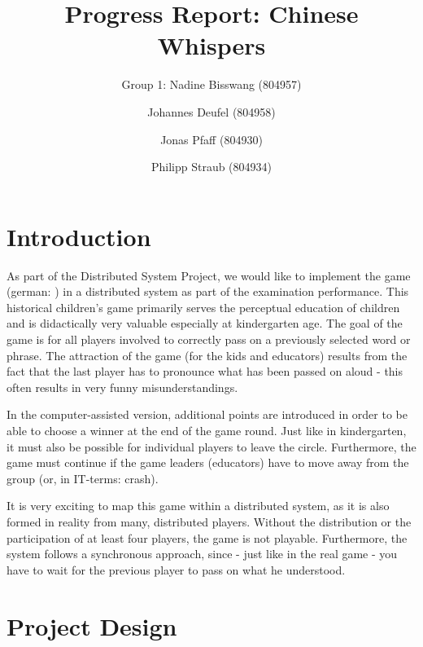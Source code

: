 \documentclass[runningheads]{llncs}
\begin{document}
\title{Progress Report: Chinese Whispers}

\author{Group 1: Nadine Bisswang (804957) \and Johannes Deufel (804958) \and Jonas Pfaff (804930) \and Philipp Straub (804934)}


\institute{}
%
\maketitle              %
\section{Introduction}
    As part of the Distributed System Project, we would like to implement the game  (german: ) in a distributed system as part of the examination performance. 
    This historical children's game primarily serves the perceptual education of children and is didactically very valuable especially at kindergarten age. The goal of the game is for all players involved to correctly pass on a previously selected word or phrase. The attraction of the game (for the kids and educators) results from the fact that the last player has to pronounce what has been passed on aloud - this often results in very funny misunderstandings. 
    
    In the computer-assisted version, additional points are introduced in order to be able to choose a winner at the end of the game round. Just like in kindergarten, it must also be possible for individual players to leave the circle. Furthermore, the game must continue if the game leaders (educators) have to move away from the group (or, in IT-terms: crash).
    
    It is very exciting to map this game within a distributed system, as it is also formed in reality from many, distributed players. Without the distribution or the participation of at least four players, the game is not playable. Furthermore, the system follows a synchronous approach, since - just like in the real game - you have to wait for the previous player to pass on what he understood.
    
\section{Project Design}
\end{document}
